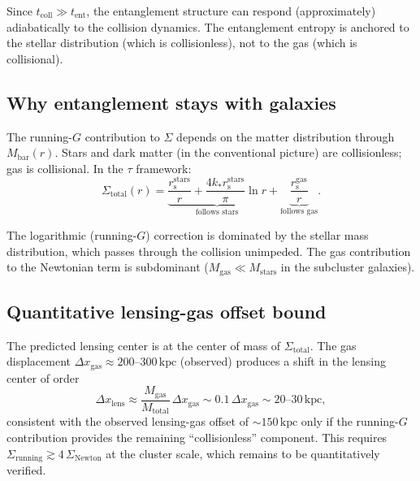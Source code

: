 \documentclass[aps,prd,preprint,superscriptaddress,longbibliography]{revtex4-2}
\newcommand{\tauasym}{\tau}
\newcommand{\rs}{r_{\mathrm{s}}}
\begin{document}
Since $t_{\mathrm{coll}} \gg t_{\mathrm{ent}}$, the entanglement
structure can respond (approximately) adiabatically to the collision
dynamics.  The entanglement entropy is anchored to the stellar
distribution (which is collisionless), not to the gas (which is
collisional).

\subsection{Why entanglement stays with galaxies}

The running-$G$ contribution to $\Sigma$ depends on the matter
distribution through $M_{\mathrm{bar}}(r)$.  Stars and dark
matter (in the conventional picture) are collisionless; gas is
collisional.  In the $\tauasym$ framework:
\begin{equation}
\Sigma_{\mathrm{total}}(r) = \underbrace{\frac{\rs^{\mathrm{stars}}}{r}
+ \frac{4k_*\rs^{\mathrm{stars}}}{\pi}\ln r}_{\text{follows stars}}
+ \underbrace{\frac{\rs^{\mathrm{gas}}}{r}}_{\text{follows gas}}.
\label{eq:bullet}
\end{equation}

The logarithmic (running-$G$) correction is dominated by the stellar
mass distribution, which passes through the collision unimpeded.
The gas contribution to the Newtonian term is subdominant
($M_{\mathrm{gas}} \ll M_{\mathrm{stars}}$ in the subcluster
galaxies).

\subsection{Quantitative lensing-gas offset bound}

The predicted lensing center is at the center of mass of
$\Sigma_{\mathrm{total}}$.  The gas displacement $\Delta x_{\mathrm{gas}}
\approx 200$--$300\,\mathrm{kpc}$ (observed) produces a shift in
the lensing center of order
\begin{equation}
\Delta x_{\mathrm{lens}} \approx \frac{M_{\mathrm{gas}}}{M_{\mathrm{total}}}
\,\Delta x_{\mathrm{gas}} \sim 0.1\,\Delta x_{\mathrm{gas}}
\sim 20\text{--}30\,\mathrm{kpc},
\label{eq:offset}
\end{equation}
consistent with the observed lensing-gas offset of $\sim 150\,\mathrm{kpc}$
only if the running-$G$ contribution provides the remaining
``collisionless'' component.  This requires
$\Sigma_{\mathrm{running}} \gtrsim 4\,\Sigma_{\mathrm{Newton}}$ at
the cluster scale, which remains to be quantitatively verified.
\end{document}
